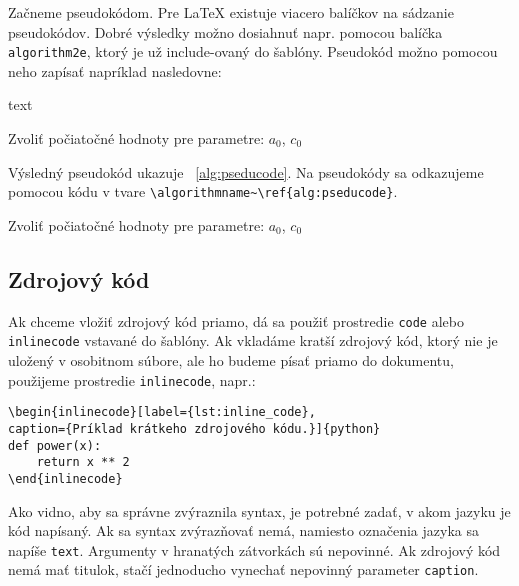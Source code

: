 Začneme pseudokódom. Pre LaTeX existuje viacero balíčkov na sádzanie pseudokódov. Dobré výsledky možno dosiahnuť napr. pomocou balíčka \texttt{algorithm2e}, ktorý je už include-ovaný do šablóny. Pseudokód možno pomocou neho zapísať napríklad nasledovne:
\begin{inlinecode}{text}
\begin{algorithm}
Zvoliť počiatočné hodnoty pre parametre: $a_0$, $c_0$\;
\caption{Príklad pseudokódu.}
\label{alg:graddesc_iterative}
\end{algorithm}
\end{inlinecode}
Výsledný pseudokód ukazuje \algorithmname~\ref{alg:pseducode}. Na pseudokódy sa odkazujeme pomocou kódu v tvare \texttt{{\textbackslash}algorithmname\textasciitilde{\textbackslash}ref\{alg:pseducode\}}.

\begin{algorithm}
Zvoliť počiatočné hodnoty pre parametre: $a_0$, $c_0$\;
\caption{Príklad pseudokódu.}
\label{alg:pseducode}
\end{algorithm}

\subsection{Zdrojový kód}

Ak chceme vložiť zdrojový kód priamo, dá sa použiť prostredie \texttt{code} alebo \texttt{inlinecode} vstavané do šablóny. Ak vkladáme kratší zdrojový kód, ktorý nie je uložený v osobitnom súbore, ale ho budeme písať priamo do dokumentu, použijeme prostredie \texttt{inlinecode}, napr.:
\begin{Verbatim}
\begin{inlinecode}[label={lst:inline_code},
caption={Príklad krátkeho zdrojového kódu.}]{python}
def power(x):
	return x ** 2
\end{inlinecode}
\end{Verbatim}
Ako vidno, aby sa správne zvýraznila syntax, je potrebné zadať, v akom jazyku je kód napísaný. Ak sa syntax zvýrazňovať nemá, namiesto označenia jazyka sa napíše \texttt{text}. Argumenty v hranatých zátvorkách sú nepovinné. Ak zdrojový kód nemá mať titulok, stačí jednoducho vynechať nepovinný parameter \texttt{caption}.


